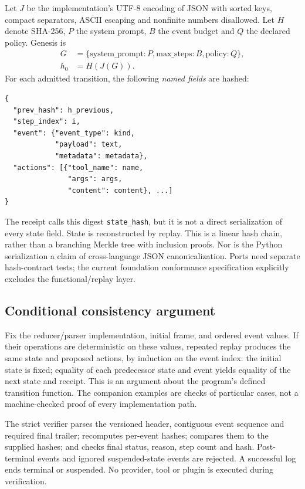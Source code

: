 \documentclass[10pt,twocolumn,letterpaper]{article}
\begin{document}
Let $J$ be the implementation's UTF-8 encoding of JSON with sorted keys, compact separators, ASCII escaping and nonfinite numbers disallowed. Let $H$ denote SHA-256, $P$ the system prompt, $B$ the event budget and $Q$ the declared policy. Genesis is
\begin{align*}
 G &= \{\text{system\_prompt}:P,\text{max\_steps}:B,\text{policy}:Q\},\\
 h_0 &= H(J(G)).
\end{align*}
For each admitted transition, the following \emph{named fields} are hashed:
\begin{lstlisting}
{
  "prev_hash": h_previous,
  "step_index": i,
  "event": {"event_type": kind,
            "payload": text,
            "metadata": metadata},
  "actions": [{"tool_name": name,
               "args": args,
               "content": content}, ...]
}
\end{lstlisting}
The receipt calls this digest \texttt{state\_hash}, but it is not a direct serialization of every state field. State is reconstructed by replay. This is a linear hash chain, rather than a branching Merkle tree with inclusion proofs. Nor is the Python serialization a claim of cross-language JSON canonicalization. Ports need separate hash-contract tests; the current foundation conformance specification explicitly excludes the functional/replay layer.

\subsection{Conditional consistency argument}
Fix the reducer/parser implementation, initial frame, and ordered event values. If their operations are deterministic on these values, repeated replay produces the same state and proposed actions, by induction on the event index: the initial state is fixed; equality of each predecessor state and event yields equality of the next state and receipt. This is an argument about the program's defined transition function. The companion examples are checks of particular cases, not a machine-checked proof of every implementation path.

The strict verifier parses the versioned header, contiguous event sequence and required final trailer; recomputes per-event hashes; compares them to the supplied hashes; and checks final status, reason, step count and hash. Post-terminal events and ignored suspended-state events are rejected. A successful log ends terminal or suspended. No provider, tool or plugin is executed during verification.
\end{document}
